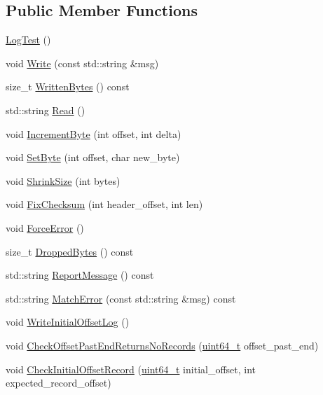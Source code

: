 \subsection*{Public Member Functions}
\begin{DoxyCompactItemize}
\item 
\hyperlink{classleveldb_1_1log_1_1_log_test_a71c5f0a5a098ca82a72e7065141a1d06}{Log\+Test} ()
\item 
void \hyperlink{classleveldb_1_1log_1_1_log_test_ab8af1c9335e7fbb42e06a6c01de2d0fc}{Write} (const std\+::string \&msg)
\item 
size\+\_\+t \hyperlink{classleveldb_1_1log_1_1_log_test_ad14bacbd6c103ac692bbb019ce9071a3}{Written\+Bytes} () const 
\item 
std\+::string \hyperlink{classleveldb_1_1log_1_1_log_test_a2f5deb8b04200600ac0bc7cd3e39bd57}{Read} ()
\item 
void \hyperlink{classleveldb_1_1log_1_1_log_test_aee52d93f17cf3e23b2ae11bd9a5f5652}{Increment\+Byte} (int offset, int delta)
\item 
void \hyperlink{classleveldb_1_1log_1_1_log_test_a2f3545c3cd495bb60b4322fa045b897c}{Set\+Byte} (int offset, char new\+\_\+byte)
\item 
void \hyperlink{classleveldb_1_1log_1_1_log_test_a2f19ddba7e239badc63920c6fb496823}{Shrink\+Size} (int bytes)
\item 
void \hyperlink{classleveldb_1_1log_1_1_log_test_ac966525faded349590f1a1ae738844cf}{Fix\+Checksum} (int header\+\_\+offset, int len)
\item 
void \hyperlink{classleveldb_1_1log_1_1_log_test_a817eeeba2beef1d81dac83badb9f1049}{Force\+Error} ()
\item 
size\+\_\+t \hyperlink{classleveldb_1_1log_1_1_log_test_afe6bc4454267707f11cd0441aeca3faf}{Dropped\+Bytes} () const 
\item 
std\+::string \hyperlink{classleveldb_1_1log_1_1_log_test_af7c61c3c2dfb9ac02a1e7b9f541fba6a}{Report\+Message} () const 
\item 
std\+::string \hyperlink{classleveldb_1_1log_1_1_log_test_a7f03fc33e830faea8090dd1aac148219}{Match\+Error} (const std\+::string \&msg) const 
\item 
void \hyperlink{classleveldb_1_1log_1_1_log_test_af0053e30c5ccaa5e2e10d595a4f48565}{Write\+Initial\+Offset\+Log} ()
\item 
void \hyperlink{classleveldb_1_1log_1_1_log_test_a2bf9cdf3b3f722c300f65a7752c0e101}{Check\+Offset\+Past\+End\+Returns\+No\+Records} (\hyperlink{stdint_8h_aaa5d1cd013383c889537491c3cfd9aad}{uint64\+\_\+t} offset\+\_\+past\+\_\+end)
\item 
void \hyperlink{classleveldb_1_1log_1_1_log_test_ab9ca8c2014e78611d66d884f7b46e4ff}{Check\+Initial\+Offset\+Record} (\hyperlink{stdint_8h_aaa5d1cd013383c889537491c3cfd9aad}{uint64\+\_\+t} initial\+\_\+offset, int expected\+\_\+record\+\_\+offset)
\end{DoxyCompactItemize}
